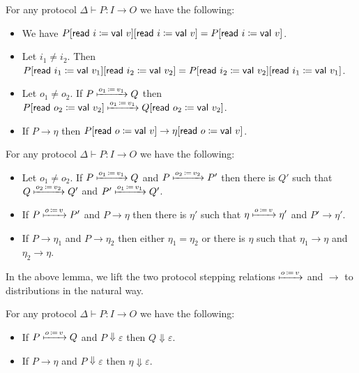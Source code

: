 \begin{lemma}
For any protocol $\Delta \vdash P : I \to O$ we have the following:
\begin{itemize}
\item We have $P[\mathsf{read} \ i \coloneqq \mathsf{val} \ v][\mathsf{read} \ i \coloneqq \mathsf{val} \ v] = P[\mathsf{read} \ i \coloneqq \mathsf{val} \ v]$.
\item Let $i_1 \neq i_2$. Then $P[\mathsf{read} \ i_1 \coloneqq \mathsf{val} \ v_1][\mathsf{read} \ i_2 \coloneqq \mathsf{val} \ v_2] = P[\mathsf{read} \ i_2 \coloneqq \mathsf{val} \ v_2][\mathsf{read} \ i_1 \coloneqq \mathsf{val} \ v_1]$.
\item Let $o_1 \neq o_2$. If $P \xmapsto{o_1 \, \coloneqq \, v_1} Q$ then $P[\mathsf{read} \ o_2 \coloneqq \mathsf{val} \ v_2] \xmapsto{o_1 \, \coloneqq \, v_1} Q[\mathsf{read} \ o_2 \coloneqq \mathsf{val} \ v_2]$.
\item If $P \to \eta$ then $P[\mathsf{read} \ o \coloneqq \mathsf{val} \ v] \to \eta[\mathsf{read} \ o \coloneqq \mathsf{val} \ v]$.
\end{itemize}
\end{lemma}

\begin{lemma}
For any protocol $\Delta \vdash P : I \to O$ we have the following:
\begin{itemize}
\item Let $o_1 \neq o_2$. If $P \xmapsto{o_1 \, \coloneqq \, v_1} Q$ and $P \xmapsto{o_2 \, \coloneqq \, v_2} P'$ then there is $Q'$ such that $Q \xmapsto{o_2 \, \coloneqq \, v_2} Q'$ and $P' \xmapsto{o_1 \, \coloneqq \, v_1} Q'$.
\item If $P \xmapsto{o \, \coloneqq \, v} P'$ and $P \to \eta$ then there is $\eta'$ such that $\eta \xmapsto{o \, \coloneqq \, v} \eta'$ and $P' \to \eta'$.
\item If $P \to \eta_1$ and $P \to \eta_2$ then either $\eta_1 = \eta_2$ or there is $\eta$ such that $\eta_1 \to \eta$ and $\eta_2 \to \eta$.
\end{itemize}
\end{lemma}

\noindent In the above lemma, we lift the two protocol stepping relations $\xmapsto{o \, \coloneqq \, v}$ and $\to$ to distributions in the natural way.

\begin{lemma}
For any protocol $\Delta \vdash P : I \to O$ we have the following:
\begin{itemize}
\item If $P \xmapsto{o \, \coloneqq \, v} Q$ and $P \Downarrow \varepsilon$ then $Q \Downarrow \varepsilon$.
\item If $P \to \eta$ and $P \Downarrow \varepsilon$ then $\eta \Downarrow \varepsilon$.
\end{itemize}
\end{lemma}

